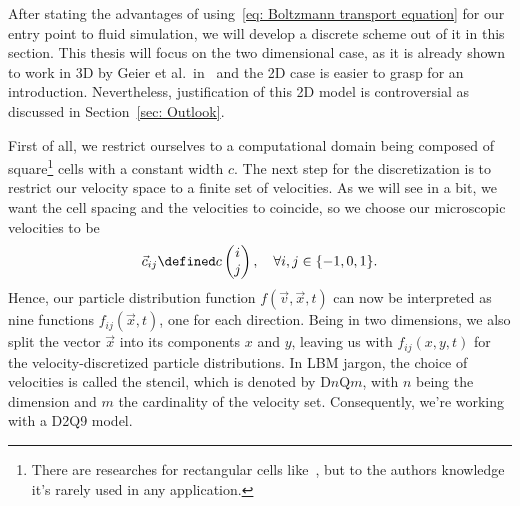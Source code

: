 After stating the advantages of using~\eqref{eq: Boltzmann transport equation} for our entry point to fluid simulation, we will develop a discrete scheme out of it in this section.
This thesis will focus on the two dimensional case, as it is already shown to work in 3D by Geier et al.\ in~\cite{geier2015cumulant} and the 2D case is easier to grasp for an introduction. Nevertheless, justification of this 2D model is controversial as discussed in Section~\ref{sec: Outlook}.

First of all, we restrict ourselves to a computational domain being composed of square\footnote{There are researches for rectangular cells like~\cite{Bouzidi2001704}, but to the authors knowledge it's rarely used in any application.} cells with a constant width $c$.
The next step for the discretization is to restrict our velocity space to a finite set of velocities. As we will see in a bit, we want the cell spacing and the velocities to coincide, so we choose our microscopic velocities to be
\begin{equation}
  \label{eq: definition of the velocities}
  \vec{c}_{ij} \defined c\begin{pmatrix}i \\ j\end{pmatrix}, \quad\forall i,j\in \{-1, 0, 1\}.
\end{equation}
Hence, our particle distribution function $f(\vec{v},\vec{x},t)$ can now be interpreted as nine functions $f_{ij}(\vec{x},t)$, one for each direction.
Being in two dimensions, we also split the vector $\vec{x}$ into its components $x$ and $y$, leaving us with $f_{ij}(x,y,t)$ for the velocity-discretized particle distributions.
In LBM jargon, the choice of velocities is called the stencil, which is denoted by D$n$Q$m$, with $n$ being the dimension and $m$ the cardinality of the velocity set. Consequently, we're working with a D2Q9 model.

